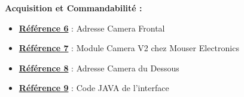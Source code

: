 \documentclass[a4paper,11pt]{report}
\begin{document}
			 \textbf{Acquisition et Commandabilité :}
				 \begin{itemize}
							\item \textbf{\href{http://169.254.14.03:8081/}{Référence 6}} : Adresse Camera Frontal
							\item \textbf{\href{https://www.mouser.fr/ProductDetail/SparkFun/DEV-14028?qs=sGAEpiMZZMsB9HsreUc \%252biQuTz4\%2fXD\%2fVgeee971KrtC4\%3d}{Référence 7}} : Module Camera V2 chez Mouser Electronics
							\item \textbf{\href{http://169.254.14.03:8000/}{Référence 8}} : Adresse Camera du Dessous
							\item \textbf{\href{https://github.com/ROV-Nautilus/Nautilus/tree/master/Interface}{Référence 9}} : Code JAVA de l'interface
				\end{itemize}
		
\end{document}
